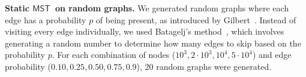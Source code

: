 \documentclass[runningheads,UKenglish]{llncs}
\newcommand{\mst}{$\mathsf{MST}$}
\newcommand{\DPmst}{\texttt{DP\_{Kruskal}}}
\newcommand{\DPmstv}[1]{\texttt{DP\_{Kruskal\_{#1}}}}
\begin{document}
%

\noindent
\textbf{Static \mst\ on random graphs.} 
We generated random graphs where each edge has a probability $p$ of being present, as introduced
by Gilbert~\cite{gilbert1959}. Instead of visiting every edge individually, we used Batagelj's 
method~\cite{Batagelj2005}, which involves generating a random number to determine how many edges
to skip based on the probability $p$. For each combination of nodes ($10^3, 2\cdot10^3, 10^4, 5\cdot10^4$)
and edge probability ($0.10, 0.25, 0.50, 0.75, 0.9$), 20 random graphs were generated.
%

\end{document}
